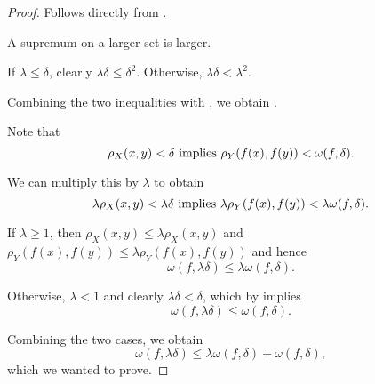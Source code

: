 \begin{proof}
   Follows directly from .

   A supremum on a larger set is larger.

   If \( \lambda \leq \delta \), clearly \( \lambda \delta \leq \delta^2 \). Otherwise, \( \lambda \delta < \lambda^2 \).

  Combining the two inequalities with , we obtain .

   Note that
  \begin{equation*}
    \rho_X(x, y) < \delta \text{ implies } \rho_Y(f(x), f(y)) < \omega(f, \delta).
  \end{equation*}

  We can multiply this by \( \lambda \) to obtain
  \begin{equation*}
    \lambda \rho_X(x, y) < \lambda \delta \text{ implies } \lambda \rho_Y(f(x), f(y)) < \lambda \omega(f, \delta).
  \end{equation*}

  If \( \lambda \geq 1 \), then \( \rho_X(x, y) \leq \lambda \rho_X(x, y) \) and \( \rho_Y(f(x), f(y)) \leq \lambda \rho_Y(f(x), f(y)) \) and hence
  \begin{equation*}
    \omega(f, \lambda \delta) \leq \lambda \omega(f, \delta).
  \end{equation*}

  Otherwise, \( \lambda < 1 \) and clearly \( \lambda \delta < \delta \), which by  implies
  \begin{equation*}
    \omega(f, \lambda \delta) \leq \omega(f, \delta).
  \end{equation*}

  Combining the two cases, we obtain
  \begin{equation*}
    \omega(f, \lambda \delta) \leq \lambda \omega(f, \delta) + \omega(f, \delta),
  \end{equation*}
  which we wanted to prove.
\end{proof}

